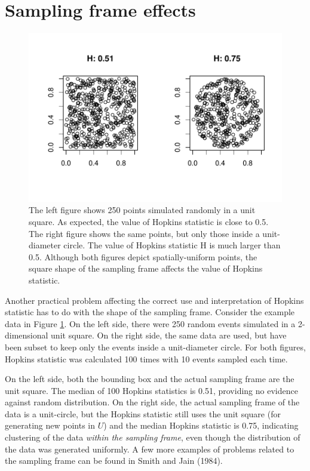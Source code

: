 \hypertarget{sampling-frame-effects}{%
\section{Sampling frame effects}\label{sampling-frame-effects}}

\begin{figure}

{\centering \includegraphics[width=0.9\linewidth]{hopkins_files/figure-latex/frame-1} 

}

\caption{The left figure shows 250 points simulated randomly in a unit square. As expected, the value of Hopkins statistic is close to 0.5. The right figure shows the same points, but only those inside a unit-diameter circle. The value of Hopkins statistic H is much larger than 0.5. Although both figures depict spatially-uniform points, the square shape of the sampling frame affects the value of Hopkins statistic.}\label{fig:frame}
\end{figure}

Another practical problem affecting the correct use and interpretation of Hopkins statistic has to do with the shape of the sampling frame. Consider the example data in Figure \ref{fig:frame}. On the left side, there were 250 random events simulated in a 2-dimensional unit square. On the right side, the same data are used, but have been subset to keep only the events inside a unit-diameter circle. For both figures, Hopkins statistic was calculated 100 times with 10 events sampled each time.

On the left side, both the bounding box and the actual sampling frame are the unit square. The median of 100 Hopkins statistics is 0.51, providing no evidence against random distribution. On the right side, the actual sampling frame of the data is a unit-circle, but the Hopkins statistic still uses the unit square (for generating new points in \(U\)) and the median Hopkins statistic is 0.75, indicating clustering of the data \emph{within the sampling frame}, even though the distribution of the data was generated uniformly. A few more examples of problems related to the sampling frame can be found in Smith and Jain (1984).


